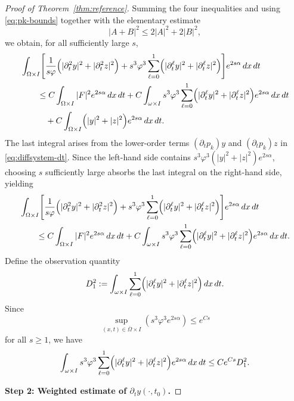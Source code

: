 \documentclass[12pt]{amsart}
\theoremstyle{plain}
\theoremstyle{definition}
\theoremstyle{remark}
\newcommand{\p}{\partial}
\newcommand{\Om}{\Omega}
\begin{document}
\begin{proof}[Proof of Theorem~\ref{thm:reference}]
Summing the four inequalities and using \eqref{eq:pk-bounds} together with
the elementary estimate $$|A+B|^2\le2|A|^2+2|B|^2,$$ we obtain, for all
sufficiently large $s$,
\begin{align}
&\int_{\Omega\times I}\Biggl[
\frac{1}{s\varphi}\Bigl(|\p_t^2 y|^2+|\p_t^2 z|^2\Bigr)
+s^3\varphi^3\sum_{\ell=0}^1
\Bigl(|\p_t^\ell y|^2+|\p_t^\ell z|^2\Bigr)
\Biggr]e^{2s\alpha}\,dx\,dt \notag\\
&\qquad\le
C\int_{\Omega\times I}|F|^2 e^{2s\alpha}\,dx\,dt
+C\int_{\omega\times I}s^3\varphi^3\sum_{\ell=0}^1
\Bigl(|\p_t^\ell y|^2+|\p_t^\ell z|^2\Bigr)e^{2s\alpha}\,dx\,dt
\notag\\
&\qquad\quad
+C\int_{\Omega\times I}
\Bigl(|y|^2+|z|^2\Bigr)e^{2s\alpha}\,dx\,dt.
\label{eq:carleman-preabsorb}
\end{align}
The last integral arises from the lower-order terms
$(\p_t p_k)y$ and $(\p_t p_k)z$ in \eqref{eq:diffsystem-dt}.
Since the left-hand side contains
$s^3\varphi^3(|y|^2+|z|^2)e^{2s\alpha}$, choosing $s$ sufficiently large
absorbs the last integral on the right-hand side, yielding
\begin{align}
&\int_{\Omega\times I}\Biggl[
\frac{1}{s\varphi}\Bigl(|\p_t^2 y|^2+|\p_t^2 z|^2\Bigr)
+s^3\varphi^3\sum_{\ell=0}^1
\Bigl(|\p_t^\ell y|^2+|\p_t^\ell z|^2\Bigr)
\Biggr]e^{2s\alpha}\,dx\,dt \notag\\
&\qquad\le
C\int_{\Omega\times I}|F|^2 e^{2s\alpha}\,dx\,dt
+C\int_{\omega\times I}s^3\varphi^3\sum_{\ell=0}^1
\Bigl(|\p_t^\ell y|^2+|\p_t^\ell z|^2\Bigr)e^{2s\alpha}\,dx\,dt.
\label{eq:carleman-system}
\end{align}
Define the observation quantity
\begin{equation}\label{eq:D1-def}
D_1^2:=\int_{\omega\times I}\sum_{\ell=0}^1
\Bigl(|\p_t^\ell y|^2+|\p_t^\ell z|^2\Bigr)\,dx\,dt.
\end{equation}
Since $$\sup_{(x,t)\in\overline\Om\times I}
(s^3\varphi^3 e^{2s\alpha})\le e^{Cs}$$ for all $s\ge1$, we have
\begin{equation}\label{eq:obs-bound}
\int_{\omega\times I}s^3\varphi^3\sum_{\ell=0}^1
\Bigl(|\p_t^\ell y|^2+|\p_t^\ell z|^2\Bigr)e^{2s\alpha}\,dx\,dt
\le C e^{Cs} D_1^2.
\end{equation}

\medskip
\noindent\textbf{Step 2: Weighted estimate of $\p_t y(\cdot,t_0)$.}


\end{proof}
\end{document}
